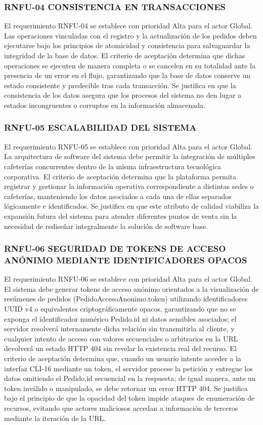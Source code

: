 \subsubsection{RNFU-04 CONSISTENCIA EN TRANSACCIONES}
El requerimiento RNFU-04 se establece con prioridad Alta para el actor Global. Las operaciones vinculadas con el registro y la actualización de los pedidos deben ejecutarse bajo los principios de atomicidad y consistencia para salvaguardar la integridad de la base de datos. El criterio de aceptación determina que dichas operaciones se ejecuten de manera completa o se cancelen en su totalidad ante la presencia de un error en el flujo, garantizando que la base de datos conserve un estado consistente y predecible tras cada transacción. Se justifica en que la consistencia de los datos asegura que los procesos del sistema no den lugar a estados incongruentes o corruptos en la información almacenada.

\subsubsection{RNFU-05 ESCALABILIDAD DEL SISTEMA}
El requerimiento RNFU-05 se establece con prioridad Alta para el actor Global. La arquitectura de software del sistema debe permitir la integración de múltiples cafeterías concurrentes dentro de la misma infraestructura tecnológica corporativa. El criterio de aceptación determina que la plataforma permita registrar y gestionar la información operativa correspondiente a distintas sedes o cafeterías, manteniendo los datos asociados a cada una de ellas separados lógicamente e identificados. Se justifica en que este atributo de calidad viabiliza la expansión futura del sistema para atender diferentes puntos de venta sin la necesidad de rediseñar integralmente la solución de software base.

\subsubsection{RNFU-06 SEGURIDAD DE TOKENS DE ACCESO ANÓNIMO MEDIANTE IDENTIFICADORES OPACOS}
El requerimiento RNFU-06 se establece con prioridad Alta para el actor Global. El sistema debe generar tokens de acceso anónimo orientados a la visualización de resúmenes de pedidos (PedidoAccesoAnonimo.token) utilizando identificadores UUID v4 o equivalentes criptográficamente opacos, garantizando que no se exponga el identificador numérico Pedido.id ni datos sensibles asociados; el servidor resolverá internamente dicha relación sin transmitirla al cliente, y cualquier intento de acceso con valores secuenciales o arbitrarios en la URL devolverá un estado HTTP 404 sin revelar la existencia real del recurso. El criterio de aceptación determina que, cuando un usuario intente acceder a la interfaz CLI-16 mediante un token, el servidor procese la petición y entregue los datos omitiendo el Pedido.id secuencial en la respuesta; de igual manera, ante un token inválido o manipulado, se debe retornar un error HTTP 404. Se justifica bajo el principio de que la opacidad del token impide ataques de enumeración de recursos, evitando que actores maliciosos accedan a información de terceros mediante la iteración de la URL.

